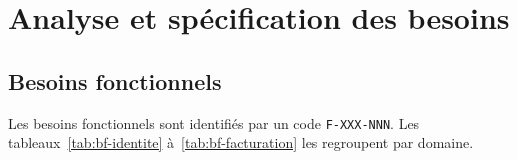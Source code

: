 \chapter{Analyse et spécification des besoins}
\label{chap:besoins}



\section{Besoins fonctionnels}

Les besoins fonctionnels sont identifiés par un code \texttt{F-XXX-NNN}. Les
tableaux~\ref{tab:bf-identite} à~\ref{tab:bf-facturation} les regroupent par domaine.

